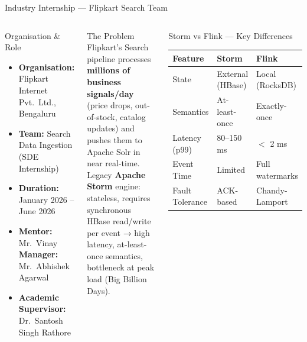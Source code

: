 \documentclass[aspectratio=169,xcolor=dvipsnames,10pt]{beamer}
\begin{document}
\begin{frame}{Industry Internship --- Flipkart Search Team}
    \begin{columns}[T]
        \begin{block}{Organisation \& Role}
            \footnotesize
            \begin{itemize}
                \item \textbf{Organisation:} Flipkart Internet Pvt.\ Ltd., Bengaluru
                \item \textbf{Team:} Search Data Ingestion (SDE Internship)
                \item \textbf{Duration:} January 2026 -- June 2026
                \item \textbf{Mentor:} Mr.\ Vinay \quad \textbf{Manager:} Mr.\ Abhishek Agarwal
                \item \textbf{Academic Supervisor:} Dr.\ Santosh Singh Rathore
            \end{itemize}
        \end{block}

        \vspace{0.4em}
        \begin{alertblock}{The Problem}
            \footnotesize
            Flipkart's Search pipeline processes \textbf{millions of business signals/day} (price drops, out-of-stock, catalog updates) and pushes them to Apache Solr in near real-time.\\[0.3em]
            Legacy \textbf{Apache Storm} engine: stateless, requires synchronous HBase read/write per event → high latency, at-least-once semantics, bottleneck at peak load (Big Billion Days).
        \end{alertblock}

        \begin{block}{Storm vs Flink --- Key Differences}
            \footnotesize
            \begin{tabular}{|l|p{1.5cm}|p{1.5cm}|}
                \hline
                \textbf{Feature} & \textbf{Storm} & \textbf{Flink} \\
                \hline
                State & External (HBase) & Local (RocksDB) \\
                \hline
                Semantics & At-least-once & Exactly-once \\
                \hline
                Latency (p99) & 80--150 ms & $<$ 2 ms \\
                \hline
                Event Time & Limited & Full watermarks \\
                \hline
                Fault Tolerance & ACK-based & Chandy-Lamport \\
                \hline
            \end{tabular}
        \end{block}


\end{columns}
\end{frame}
\end{document}
